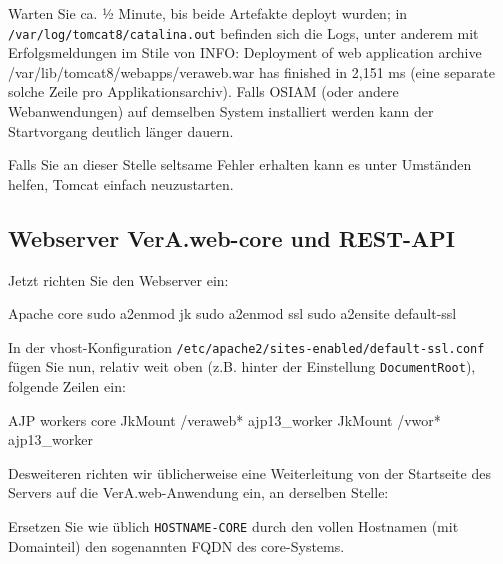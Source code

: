 \documentclass{tarentanleitung}
\begin{document}
Warten Sie ca. ½ Minute, bis beide Artefakte deployt wurden; in
\texttt{/var/log/tomcat8/catalina.out} befinden sich die Logs,
unter anderem mit Erfolgsmeldungen im Stile von {\ttfamily
INFO: Deployment of web application archive
/var/lib/tomcat8/webapps/veraweb.war has finished in 2,151 ms}
(eine separate solche Zeile pro Applikationsarchiv).
Falls OSIAM (oder andere Webanwendungen) auf demselben System
installiert werden kann der Startvorgang deutlich länger dauern.

Falls Sie an dieser Stelle seltsame Fehler erhalten kann es unter
Umständen helfen, Tomcat einfach neuzustarten.

\subsection{Webserver VerA.web-core und REST-API}\label{subsec:setup-core-apache}

\begin{minipage}{\linewidth}
Jetzt richten Sie den Webserver ein:

\begin{lstdump}{Apache core}
sudo a2enmod jk
sudo a2enmod ssl
sudo a2ensite default-ssl
\end{lstdump}
\end{minipage}

\begin{minipage}{\linewidth}
In der vhost-Konfiguration \texttt{/etc/apache2/sites-enabled/default-ssl.conf}
fügen Sie nun, relativ weit oben (z.B. hinter der Einstellung
\texttt{DocumentRoot}), folgende Zeilen ein:

\begin{lstdump}{AJP workers core}
JkMount /veraweb* ajp13_worker
JkMount /vwor* ajp13_worker
\end{lstdump}
\end{minipage}

\begin{minipage}{\linewidth}
Desweiteren richten wir üblicherweise eine Weiterleitung von der
Startseite des Servers auf die VerA.web-Anwendung ein, an derselben Stelle:

\end{minipage}

Ersetzen Sie wie üblich \texttt{HOSTNAME-CORE} durch den vollen
Hostnamen (mit Domainteil) \dash den sogenannten FQDN \dash des
core-Systems.
\end{document}
